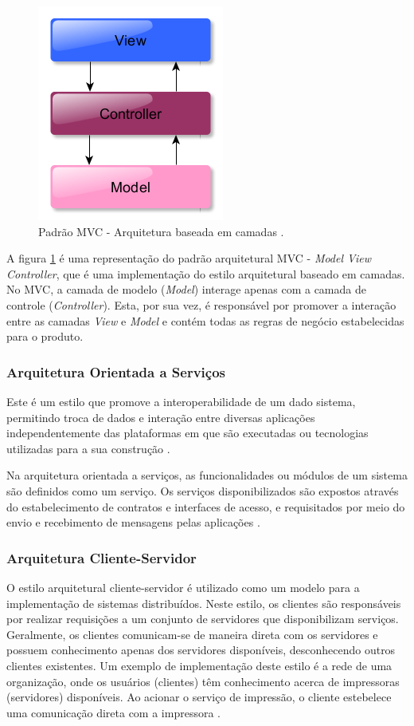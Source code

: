 \begin{figure}[htb]
\centering
\includegraphics[scale=0.5]{figuras/modelo_mvc.PNG}
\caption{Padrão MVC - Arquitetura baseada em camadas \cite{pressman2006engenharia}.}
\label{modelo_mvc}
\end{figure}

A figura \ref{modelo_mvc} é uma representação do padrão arquitetural MVC - \textit{Model View Controller}, que é uma implementação do estilo arquitetural baseado em camadas. No MVC, a camada de modelo (\textit{Model}) interage apenas com a camada de controle (\textit{Controller}). Esta, por sua vez, é responsável por promover a interação entre as camadas \textit{View} e \textit{Model} e contém todas as regras de negócio estabelecidas para o produto.

\subsubsection{Arquitetura Orientada a Serviços}

Este é um estilo que promove a interoperabilidade de um dado sistema, permitindo troca de dados e interação entre diversas aplicações independentemente das plataformas em que são executadas ou tecnologias utilizadas para a sua construção \cite{oqueesoa_2010}.

Na arquitetura orientada a serviços, as funcionalidades ou módulos de um sistema são definidos como um serviço. Os serviços disponibilizados são expostos através do estabelecimento de contratos e interfaces de acesso, e requisitados por meio do envio e recebimento de mensagens pelas aplicações \cite{oqueesoa_2010}.

\subsubsection{Arquitetura Cliente-Servidor}
O estilo arquitetural cliente-servidor é utilizado como um modelo para a implementação de sistemas distribuídos. Neste estilo, os clientes são responsáveis por realizar requisições a um conjunto de servidores que disponibilizam serviços. Geralmente, os clientes comunicam-se de maneira direta com os servidores e possuem conhecimento apenas dos servidores disponíveis, desconhecendo outros clientes existentes. Um exemplo de implementação deste estilo é a rede de uma organização, onde os usuários (clientes) têm conhecimento acerca de impressoras (servidores) disponíveis. Ao acionar o serviço de impressão, o cliente estebelece uma comunicação direta com a impressora \cite{sommerville2008engenharia}.

